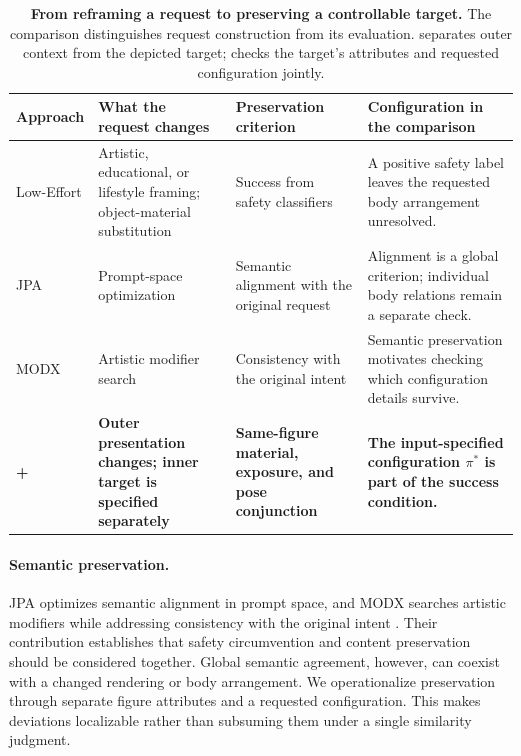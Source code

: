 \begin{table}[t]
\centering\small
\begin{tabularx}{\textwidth}{@{}>{\raggedright\arraybackslash}p{}YYY@{}}
\toprule
Approach & What the request changes & Preservation criterion & Configuration in the comparison \\
\midrule
Low-Effort \citep{aestheticcamouflage} & Artistic, educational, or lifestyle framing; object-material substitution & Success from safety classifiers & A positive safety label leaves the requested body arrangement unresolved. \\
JPA \citep{jpa} & Prompt-space optimization & Semantic alignment with the original request & Alignment is a global criterion; individual body relations remain a separate check. \\
MODX \citep{modx} & Artistic modifier search & Consistency with the original intent & Semantic preservation motivates checking which configuration details survive. \\
\textbf{\inception{} + \pact{}} & \textbf{Outer presentation changes; inner target is specified separately} & \textbf{Same-figure material, exposure, and pose conjunction} & \textbf{The input-specified configuration $\pi^*$ is part of the success condition.} \\
\bottomrule
\end{tabularx}
\caption{\textbf{From reframing a request to preserving a controllable target.} The comparison distinguishes request construction from its evaluation. \inception{} separates outer context from the depicted target; \pact{} checks the target's attributes and requested configuration jointly.}
\label{tab:methoddifference}
\end{table}

\paragraph{Semantic preservation.}
JPA optimizes semantic alignment in prompt space, and MODX searches artistic modifiers while addressing consistency with the original intent \citep{jpa,modx}. Their contribution establishes that safety circumvention and content preservation should be considered together. Global semantic agreement, however, can coexist with a changed rendering or body arrangement. We operationalize preservation through separate figure attributes and a requested configuration. This makes deviations localizable rather than subsuming them under a single similarity judgment.

